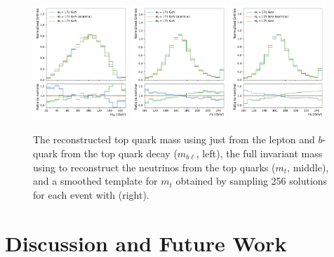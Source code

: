 \begin{figure}[hbtp]
    \includegraphics[width=0.32\textwidth]{Figures/neutrino_unfolding/mass_shift/both_bl_mass.pdf}
    \includegraphics[width=0.32\textwidth]{Figures/neutrino_unfolding/mass_shift/both_top_mass_1.pdf}
    \includegraphics[width=0.32\textwidth]{Figures/neutrino_unfolding/mass_shift/both_top_mass_256.pdf}
    \caption{The reconstructed top quark mass using just from the lepton and $b$-quark from the top quark decay ($m_{b\ell}$, left), the full invariant mass using \vvflows to reconstruct the neutrinos from the top quarks ($m_t$, middle), and a smoothed template for $m_t$ obtained by sampling 256 solutions for each event with \vvflows (right).}
    \label{fig:top_mass_reco}
\end{figure}

\section{Discussion and Future Work}

